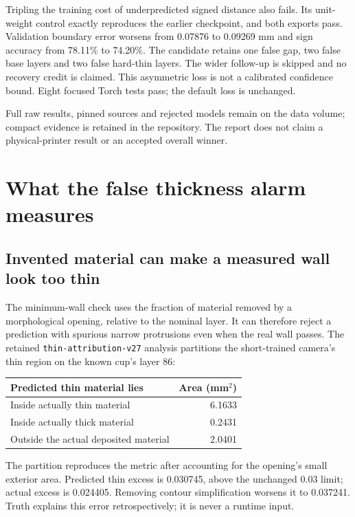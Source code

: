 \documentclass[10pt,letterpaper]{article}
\begin{document}
Tripling the training cost of underpredicted signed distance also fails. Its
unit-weight control exactly reproduces the earlier checkpoint, and both exports
pass. Validation boundary error worsens from 0.07876 to 0.09269 mm and sign
accuracy from 78.11\% to 74.20\%. The candidate retains one false gap, two false
base layers and two false hard-thin layers. The wider follow-up is skipped and
no recovery credit is claimed. This asymmetric loss is not a calibrated
confidence bound. Eight focused Torch tests pass; the default loss is unchanged.

Full raw results, pinned sources and rejected models remain on the data volume;
compact evidence is retained in the repository. The report does not claim a
physical-printer result or an accepted overall winner.

\clearpage
\section{What the false thickness alarm measures}

\subsection*{Invented material can make a measured wall look too thin}
The minimum-wall check uses the fraction of material removed by a morphological
opening, relative to the nominal layer. It can therefore reject a prediction
with spurious narrow protrusions even when the real wall passes. The retained
\texttt{thin-attribution-v27} analysis partitions the short-trained camera's
thin region on the known cup's layer 86:

\begin{center}
\begin{tabular}{@{}lr@{}}
\toprule
Predicted thin material lies & Area (mm$^2$) \\
\midrule
Inside actually thin material & 6.1633 \\
Inside actually thick material & 0.2431 \\
Outside the actual deposited material & 2.0401 \\
\bottomrule
\end{tabular}
\end{center}

The partition reproduces the metric after accounting for the opening's small
exterior area. Predicted thin excess is 0.030745, above the unchanged 0.03 limit;
actual excess is 0.024405. Removing contour simplification worsens it to 0.037241.
Truth explains this error retrospectively; it is never a runtime input.
\end{document}
